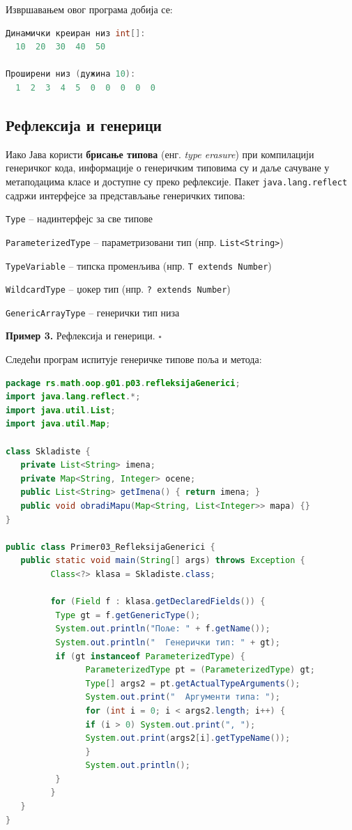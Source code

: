 Извршавањем овог програма добија се:

\begin{lstlisting}[language=Java]
Динамички креиран низ int[]:
  10  20  30  40  50
 
Проширени низ (дужина 10):
  1  2  3  4  5  0  0  0  0  0
\end{lstlisting}

\subsection{Рефлексија и генерици}

Иако Јава користи \textbf{брисање типова} (енг. \textit{type erasure}) при компилацији генеричког кода, информације о генеричким типовима су и даље сачуване у метаподацима класе и доступне су преко рефлексије. Пакет \texttt{java.lang.reflect} садржи интерфејсе за представљање генеричких типова:

\texttt{Type} – надинтерфејс за све типове

\texttt{ParameterizedType} – параметризовани тип (нпр. \texttt{List\textless{}String\textgreater{}})

\texttt{TypeVariable} – типска променљива (нпр. \texttt{T extends Number})

\texttt{WildcardType} – џокер тип (нпр. \texttt{? extends Number})

\texttt{GenericArrayType} – генерички тип низа


\bigskip

\noindent \textbf{Пример 3.} Рефлексија и генерици. $\square$

\medskip

Следећи програм испитује генеричке типове поља и метода:

\begin{lstlisting}[language=Java]
package rs.math.oop.g01.p03.refleksijaGenerici;
import java.lang.reflect.*;
import java.util.List;
import java.util.Map;
 
class Skladiste {
   private List<String> imena;
   private Map<String, Integer> ocene;
   public List<String> getImena() { return imena; }
   public void obradiMapu(Map<String, List<Integer>> mapa) {}
}
 
public class Primer03_RefleksijaGenerici {
   public static void main(String[] args) throws Exception {
         Class<?> klasa = Skladiste.class;
 
         for (Field f : klasa.getDeclaredFields()) {
          Type gt = f.getGenericType();
          System.out.println("Поље: " + f.getName());
          System.out.println("  Генерички тип: " + gt);
          if (gt instanceof ParameterizedType) {
                ParameterizedType pt = (ParameterizedType) gt;
                Type[] args2 = pt.getActualTypeArguments();
                System.out.print("  Аргументи типа: ");
                for (int i = 0; i < args2.length; i++) {
                if (i > 0) System.out.print(", ");
                System.out.print(args2[i].getTypeName());
                }
                System.out.println();
          }
         }
   }
}
\end{lstlisting}


